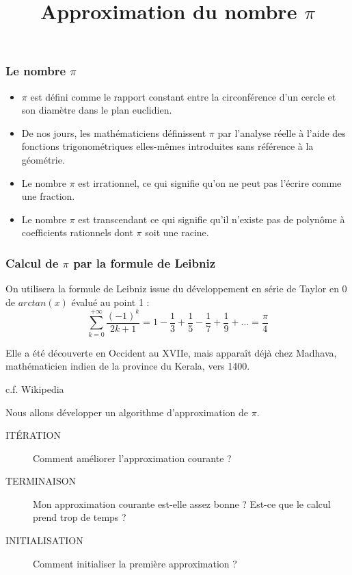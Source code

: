 \documentclass[10pt]{beamer}
\title{Approximation du nombre $\pi$}
\begin{document}
\maketitle



\begin{frame}
  \frametitle{Le nombre $\pi$}
  \begin{itemize}
  \item $\pi$ est défini comme le rapport constant entre la circonférence d’un cercle et son diamètre dans le plan euclidien.
  \item De nos jours, les mathématiciens définissent $\pi$ par l’analyse réelle à l’aide des fonctions trigonométriques elles-mêmes introduites sans référence à la géométrie.
  \item Le nombre $\pi$ est \alert{irrationnel}, ce qui signifie qu'on ne peut pas l’écrire comme une fraction.
  \item Le nombre $\pi$ est \alert{transcendant} ce qui signifie qu'il n’existe pas de polynôme à coefficients rationnels dont $\pi$ soit une racine.
  \end{itemize}
\end{frame}


\begin{frame}
  \frametitle{Calcul de $\pi$ par la formule de Leibniz}
  On utilisera la formule de Leibniz issue du développement en série de Taylor en 0 de $arctan(x)$ évalué au point 1 :
  \alert{
    \[
      \sum_{k=0}^{+\infty} \frac{(-1)^k}{2k+ 1} = 1 - \frac{1}{3} + \frac{1}{5}  - \frac{1}{7} + \frac{1}{9} + \ldots = \frac{\pi}{4}
    \]
    }

Elle a été découverte en Occident au XVIIe, mais apparaît déjà chez Madhava, mathématicien indien de la province du Kerala, vers 1400.
\begin{flushright}
c.f. Wikipedia
\end{flushright}

Nous allons développer un algorithme d'approximation de $\pi$.
  \begin{description}
  \item[ITÉRATION] Comment améliorer l'approximation courante ?
  \item[TERMINAISON] Mon approximation courante est-elle assez bonne ? Est-ce que le calcul prend trop de temps ?
  \item[INITIALISATION] Comment initialiser la première approximation ?
  \end{description}

\end{frame}
\end{document}
